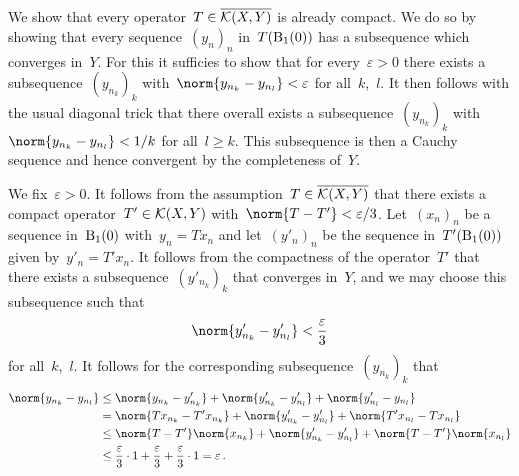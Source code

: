 \section{}





\subsection{}

We show that every operator~$T \in \overline{ \mathcal{K}(X,Y) }$ is already compact.
We do so by showing that every sequence~$(y_n)_n$ in~$T(\operatorname{B}_{1}(0))$ has a subsequence which converges in~$Y$.
For this it sufficies to show that for every~$\varepsilon > 0$ there exists a subsequence~$(y_{n_k})_k$ with~$\norm{y_{n_k} - y_{n_l}} < \varepsilon$ for all~$k$,~$l$.
It then follows with the usual diagonal trick that there overall exists a subsequence~$(y_{n_k})_k$ with~$\norm{y_{n_k} - y_{n_l}} < 1/k$ for all~$l \geq k$.
This subsequence is then a Cauchy sequence and hence convergent by the completeness of~$Y$.

We fix~$\varepsilon > 0$.
It follows from the assumption~$T \in \overline{ \mathcal{K}(X,Y) }$ that there exists a compact operator~$T' \in \mathcal{K}(X,Y)$ with~$\norm{T - T'} < \varepsilon / 3$.
Let~$(x_n)_n$ be a sequence in~$\operatorname{B}_{1}(0)$ with~$y_n = T x_n$ and let~$(y'_n)_n$ be the sequence in~$T'( \operatorname{B}_{1}(0) )$ given by~$y'_n = T' x_n$.
It follows from the compactness of the operator~$T'$ that there exists a subsequence~$(y'_{n_k})_k$ that converges in~$Y$, and we may choose this subsequence such that
\[
  \norm{ y'_{n_k} - y'_{n_l} } < \frac{\varepsilon}{3}
\]
for all~$k$,~$l$.
It follows for the corresponding subsequence~$(y_{n_k})_k$ that
\begin{align*}
  \norm{ y_{n_k} - y_{n_l} }
  &\leq
    \norm{ y_{n_k} - y'_{n_k} }
  + \norm{ y'_{n_k} - y'_{n_l} }
  + \norm{ y'_{n_l} - y_{n_l} }
  \\
  &=
    \norm{ T x_{n_k} - T' x_{n_k} }
  + \norm{ y'_{n_k} - y'_{n_l} }
  + \norm{ T' x_{n_l} - T x_{n_l} }
  \\
  &\leq
    \norm{T - T'} \norm{x_{n_k}}
  + \norm{ y'_{n_k} - y'_{n_l} }
  + \norm{T - T'} \norm{x_{n_l}}
  \\
  &\leq
    \frac{\varepsilon}{3} \cdot 1
  + \frac{\varepsilon}{3}
  + \frac{\varepsilon}{3} \cdot 1
  =
  \varepsilon \,.
\end{align*}






